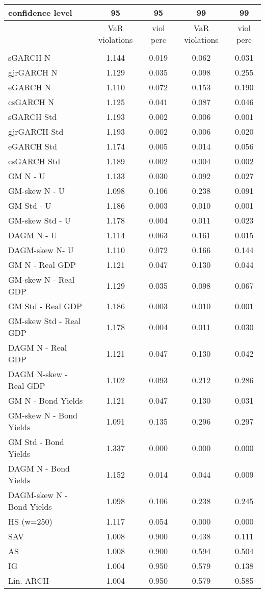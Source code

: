 \documentclass{article}
\begin{document}


\begin{table}[ht]
\centering
\begin{tabular}{lcccc}
  \hline
confidence level  & 95 & 95 & 99 & 99 \\ 
  \hline
  & VaR violations & viol perc & VaR violations & viol perc\\
  &\\
sGARCH N & 1.144 & 0.019 & 0.062 & 0.031 \\ 
  gjrGARCH N & 1.129 & 0.035 & 0.098 & 0.255 \\ 
  eGARCH N & 1.110 & 0.072 & 0.153 & 0.190 \\ 
  csGARCH N & 1.125 & 0.041 & 0.087 & 0.046 \\ 
  sGARCH Std & 1.193 & 0.002 & 0.006 & 0.001 \\ 
  gjrGARCH Std & 1.193 & 0.002 & 0.006 & 0.020 \\ 
  eGARCH Std & 1.174 & 0.005 & 0.014 & 0.056 \\ 
  csGARCH Std & 1.189 & 0.002 & 0.004 & 0.002 \\ 
  \hline
  GM N - U & 1.133 & 0.030 & 0.092 & 0.027 \\ 
  GM-skew N - U & 1.098 & 0.106 & 0.238 & 0.091 \\ 
  GM Std - U & 1.186 & 0.003 & 0.010 & 0.001 \\ 
  GM-skew Std - U & 1.178 & 0.004 & 0.011 & 0.023 \\ 
  DAGM N - U & 1.114 & 0.063 & 0.161 & 0.015 \\ 
  DAGM-skew  N- U & 1.110 & 0.072 & 0.166 & 0.144 \\ 
  GM N - Real GDP & 1.121 & 0.047 & 0.130 & 0.044 \\ 
  GM-skew N - Real GDP & 1.129 & 0.035 & 0.098 & 0.067 \\ 
  GM Std - Real GDP & 1.186 & 0.003 & 0.010 & 0.001 \\ 
  GM-skew Std - Real GDP & 1.178 & 0.004 & 0.011 & 0.030 \\ 
  DAGM N - Real GDP & 1.121 & 0.047 & 0.130 & 0.042 \\ 
  DAGM N-skew - Real GDP & 1.102 & 0.093 & 0.212 & 0.286 \\ 
  GM N - Bond Yields & 1.121 & 0.047 & 0.130 & 0.031 \\ 
  GM-skew N - Bond Yields & 1.091 & 0.135 & 0.296 & 0.297 \\ 
  GM Std - Bond Yields & 1.337 & 0.000 & 0.000 & 0.000 \\ 
  DAGM N - Bond Yields & 1.152 & 0.014 & 0.044 & 0.009 \\ 
  DAGM-skew N - Bond Yields & 1.098 & 0.106 & 0.238 & 0.245 \\
  \hline
  HS (w=250) & 1.117 & 0.054 & 0.000 & 0.000 \\ 
  SAV & 1.008 & 0.900 & 0.438 & 0.111 \\ 
  AS & 1.008 & 0.900 & 0.594 & 0.504 \\ 
  IG & 1.004 & 0.950 & 0.579 & 0.138 \\ 
  Lin. ARCH & 1.004 & 0.950 & 0.579 & 0.585 \\ 
   \hline
\end{tabular}
\end{table}
\end{document}
